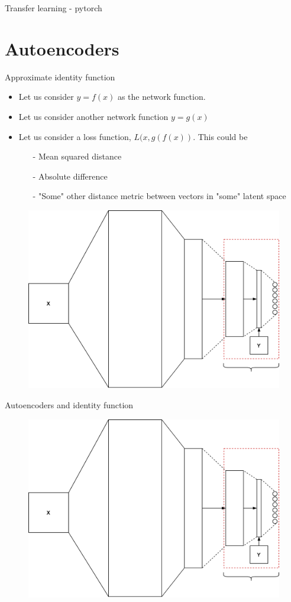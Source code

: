 \begin{frame}{Transfer learning - pytorch}

\end{frame}
\section{Autoencoders}
\begin{frame}{Approximate identity function}
\begin{itemize}
	\item Let us consider $y=f(x)$ as the network function.
	\item Let us consider another network function $y=g(x)$
	\item Let us consider a loss function, $L(x,g(f(x))$. This could be 
	\begin{itemize}
		\item[-] Mean squared distance 
		\item[-] Absolute difference 
		\item[-] "Some" other distance metric between vectors in "some" latent space 
	\end{itemize}  
\end{itemize}
	\begin{figure}
		\includegraphics[width=.45\textwidth]{figures/autoencoder_1}
	\end{figure}
\end{frame}
\begin{frame}{Autoencoders and identity function} 
	\begin{center}
		\begin{figure}
			\includegraphics[width=.8\textwidth]{figures/autoencoder_1}
		\end{figure}
	\end{center}
\end{frame}
